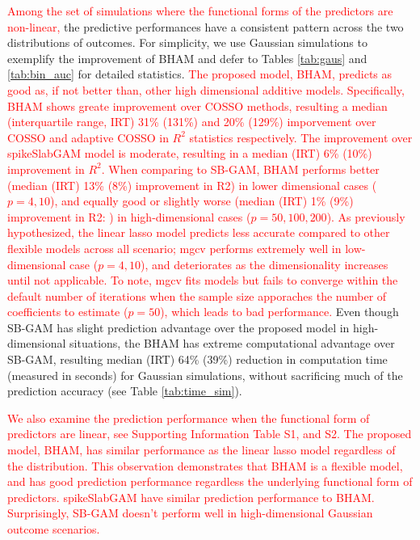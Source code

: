 \documentclass[AMA,STIX1COL,]{WileyNJD-v2}
\begin{document}
\textcolor{red}{Among the set of simulations where the functional forms of the predictors are non-linear,}
the predictive performances have a consistent pattern across the two
distributions of outcomes. For simplicity, we use Gaussian simulations
to exemplify the improvement of BHAM and defer to Tables \ref{tab:gaus}
and \ref{tab:bin_auc} for detailed statistics.
\textcolor{red}{The proposed model, BHAM, predicts as good as, if not better than, other high dimensional additive models. Specifically, BHAM shows greate improvement over COSSO methods, resulting a median (interquartile range, IRT) 31\% (131\%) and 20\% (129\%) imporvement over COSSO and adaptive COSSO in $R^2$ statistics respectively. The improvement over spikeSlabGAM model is moderate, resulting in a median (IRT) 6\% (10\%) improvement in $R^2$. When comparing to SB-GAM, BHAM performs better (median (IRT) 13\% (8\%) improvement in R2) in lower dimensional cases ($p=4,10$), and equally good or slightly worse (median (IRT) 1\% (9\%) improvement in R2: ) in high-dimensional cases ($p=50,100, 200$). As previously hypothesized, the linear lasso model predicts less accurate compared to other flexible models across all scenario; mgcv performs extremely well in low-dimensional case ($p = 4, 10$), and deteriorates as the dimensionality increases until not applicable. To note, mgcv fits models but fails to converge within the default number of iterations when the sample size apporaches the number of coefficients to estimate ($p=50$), which leads to bad performance.}
Even though SB-GAM has slight prediction advantage over the proposed
model in high-dimensional situations, the BHAM has extreme computational
advantage over SB-GAM, resulting median (IRT) 64\% (39\%) reduction in
computation time (measured in seconds) for Gaussian simulations, without
sacrificing much of the prediction accuracy (see Table
\ref{tab:time_sim}).

\textcolor{red}{We also examine the prediction performance when the functional form of predictors are linear, see Supporting Information Table S1, and S2. The proposed model, BHAM, has similar performance as the linear lasso model regardless of the distribution. This observation demonstrates that BHAM is a flexible model, and has good prediction performance regardless the underlying functional form of predictors. spikeSlabGAM have similar prediction performance to BHAM. Surprisingly, SB-GAM doesn't perform well in high-dimensional Gaussian outcome scenarios.}
\end{document}
